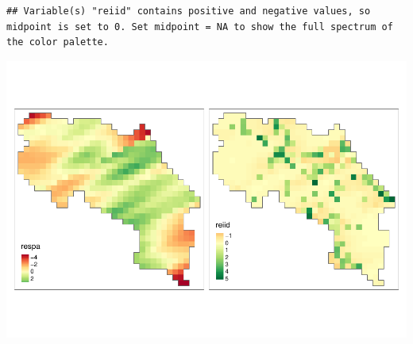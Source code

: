 \documentclass[
]{article}
\begin{document}
\begin{verbatim}
## Variable(s) "reiid" contains positive and negative values, so midpoint is set to 0. Set midpoint = NA to show the full spectrum of the color palette.
\end{verbatim}

\includegraphics{hw4_files/figure-latex/unnamed-chunk-4-1.pdf}
\end{document}
